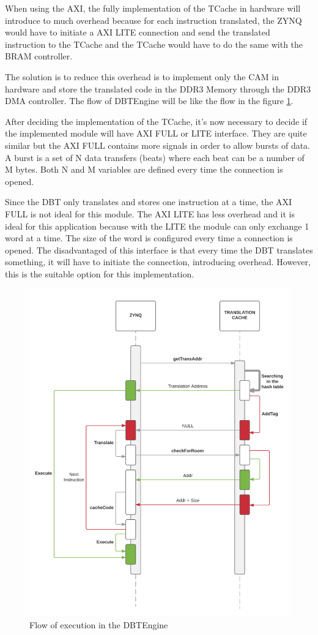 When using the AXI, the fully implementation of the TCache in hardware will introduce to much overhead because for each instruction translated, the ZYNQ would have to initiate a AXI LITE connection and send the translated instruction to the TCache and the TCache would have to do the same with the BRAM controller.

The solution is to reduce this overhead is to implement only the CAM in hardware and store the translated code in the DDR3 Memory through the DDR3 DMA controller. The flow of DBTEngine will be like the flow in the figure \ref{fig:flow}. 

After deciding the implementation of the TCache, it's now necessary to decide if the implemented module will have AXI FULL or LITE interface. They are quite similar but the AXI FULL contains more signals in order to allow bursts of data. A burst is a set of N data transfers (beats) where each beat can be a number of M bytes. Both N and M variables are defined every time the connection is opened. 

Since the DBT only translates and stores one instruction at a time, the AXI FULL is not ideal for this module. The AXI LITE has less overhead and it is ideal for this application because with the LITE the module can only exchange 1 word at a time. The size of the word is configured every time a connection is opened. The disadvantaged of this interface is that every time the DBT translates something, it will have to initiate the connection, introducing overhead. However, this is the suitable option for this implementation.

\begin{figure} [H]
	\centering
	\includegraphics[scale = 0.12]{images/flow.png}
	\caption{Flow of execution in the DBTEngine}
	\label{fig:flow}
\end{figure}

